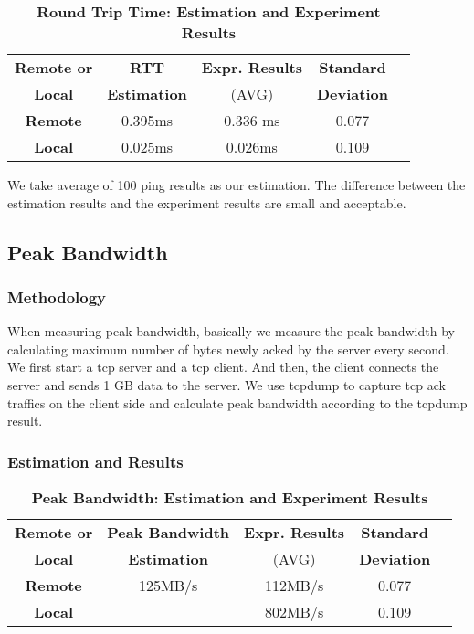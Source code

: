 \begin{table}[ht]
  \centering
  \caption{\textbf{Round Trip Time: Estimation and Experiment Results}}
  \begin{threeparttable}
  \begin{tabular}{ccccc}
  \hline
      \textbf{Remote or} & \textbf{RTT}   & \textbf{Expr. Results} & \textbf{Standard}\\
      \textbf{Local}   &  \textbf{Estimation}  & (AVG)   & \textbf{Deviation} \\
  \hline
      \textbf{Remote}  & 0.395ms & 0.336 ms & 0.077  \\
      \textbf{Local} & 0.025ms & 0.026ms & 0.109  \\
  \hline
  \end{tabular}
  \end{threeparttable}
  \label{round_trip_time_table}
\end{table}

We take average of 100 ping results as our estimation. The difference between the estimation results and the experiment results are small and acceptable. 

\subsection{Peak Bandwidth}

\subsubsection{Methodology}
When measuring peak bandwidth, basically we measure the peak bandwidth by calculating maximum number of bytes newly acked by the server every second. We first start a tcp server and a tcp client. And then, the client connects the server and sends 1 GB data to the server. We use tcpdump to capture tcp ack traffics on the client side and calculate peak bandwidth according to the tcpdump result. 

\subsubsection{Estimation and Results}
\begin{table}[ht]
  \centering
  \caption{\textbf{Peak Bandwidth: Estimation and Experiment Results}}
  \begin{threeparttable}
  \begin{tabular}{ccccc}
  \hline
      \textbf{Remote or} & \textbf{Peak Bandwidth}   & \textbf{Expr. Results} & \textbf{Standard}\\
      \textbf{Local}   &  \textbf{Estimation}  & (AVG)   & \textbf{Deviation} \\
  \hline
      \textbf{Remote}  & 125MB/s & 112MB/s & 0.077  \\
      \textbf{Local} &  & 802MB/s & 0.109  \\
  \hline
  \end{tabular}
  \end{threeparttable}
  \label{peak_bandwidth_table}
\end{table}

